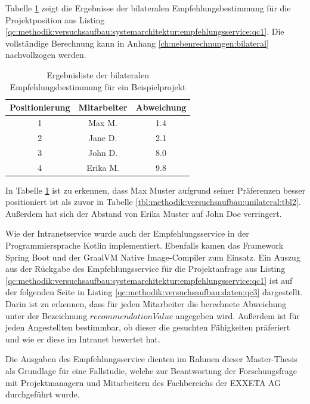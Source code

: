 Tabelle \ref{tbl:methodik:versuchsaufbau:bilateral:tbl2} zeigt die Ergebnisse der bilateralen Empfehlungsbestimmung für die Projektposition aus Listing \ref{qc:methodik:versuchsaufbau:systemarchitektur:empfehlungsservice:qc1}. Die vollständige Berechnung kann in Anhang \ref{ch:nebenrechnungen:bilateral} nachvollzogen werden.

\begin{table}[h]
	\centering
	\begin{tabular}{c|c|c}
		\textbf{Positionierung} & \textbf{Mitarbeiter} & \textbf{Abweichung}\\
		\hline
		1 & Max M.   & 1.4\\
		2 & Jane D.  & 2.1\\
		3 & John D.  & 8.0\\
		4 & Erika M. & 9.8
	\end{tabular}
	\caption{Ergebnisliste der bilateralen Empfehlungsbestimmung für ein Beispielprojekt}
	\label{tbl:methodik:versuchsaufbau:bilateral:tbl2}
\end{table}

In Tabelle \ref{tbl:methodik:versuchsaufbau:bilateral:tbl2} ist zu erkennen, dass Max Muster aufgrund seiner Präferenzen besser positioniert ist als zuvor in Tabelle \ref{tbl:methodik:versuchsaufbau:unilateral:tbl2}. Außerdem hat sich der Abstand von Erika Muster auf John Doe verringert.

Wie der Intranetservice wurde auch der Empfehlungsservice in der Programmiersprache Kotlin implementiert. Ebenfalls kamen das Framework Spring Boot und der GraalVM Native Image-Compiler zum Einsatz. Ein Auszug aus der Rückgabe des Empfehlungsservice für die Projektanfrage aus Listing \ref{qc:methodik:versuchsaufbau:systemarchitektur:empfehlungsservice:qc1} ist auf der folgenden Seite in Listing \ref{qc:methodik:versuchsaufbau:daten:qc3} dargestellt. Darin ist zu erkennen, dass für jeden Mitarbeiter die berechnete Abweichung unter der Bezeichnung $recommendationValue$ angegeben wird. Außerdem ist für jeden Angestellten bestimmbar, ob dieser die gesuchten Fähigkeiten präferiert und wie er diese im Intranet bewertet hat.

Die Ausgaben des Empfehlungsservice dienten im Rahmen dieser Master-Thesis als Grundlage für eine Fallstudie, welche zur Beantwortung der Forschungsfrage mit Projektmanagern und Mitarbeitern des Fachbereichs \JES der EXXETA AG durchgeführt wurde.

\begin{minipage}{\linewidth}

\end{minipage}


